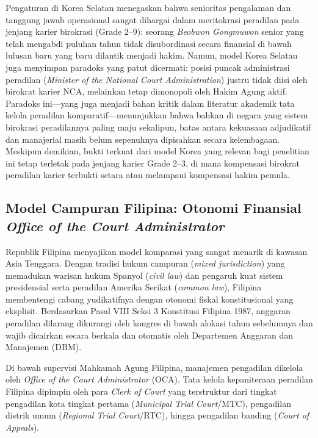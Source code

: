 \documentclass[12pt, a4paper]{article}
\begin{document}
Pengaturan di Korea Selatan menegaskan bahwa senioritas pengalaman dan tanggung jawab operasional sangat dihargai dalam meritokrasi peradilan pada jenjang karier birokrasi (Grade 2--9): seorang \textit{Beobwon Gongmuwon} senior yang telah mengabdi puluhan tahun tidak disubordinasi secara finansial di bawah lulusan baru yang baru dilantik menjadi hakim. Namun, model Korea Selatan juga menyimpan paradoks yang patut dicermati: posisi puncak administrasi peradilan (\textit{Minister of the National Court Administration}) justru tidak diisi oleh birokrat karier NCA, melainkan tetap dimonopoli oleh Hakim Agung aktif. Paradoks ini---yang juga menjadi bahan kritik dalam literatur akademik tata kelola peradilan komparatif---menunjukkan bahwa bahkan di negara yang sistem birokrasi peradilannya paling maju sekalipun, batas antara kekuasaan adjudikatif dan manajerial masih belum sepenuhnya dipisahkan secara kelembagaan. Meskipun demikian, bukti terkuat dari model Korea yang relevan bagi penelitian ini tetap terletak pada jenjang karier Grade 2--3, di mana kompensasi birokrat peradilan karier terbukti setara atau melampaui kompensasi hakim pemula.

\subsection{Model Campuran Filipina: Otonomi Finansial \textit{Office of the Court Administrator}}

Republik Filipina menyajikan model komparasi yang sangat menarik di kawasan Asia Tenggara. Dengan tradisi hukum campuran (\textit{mixed jurisdiction}) yang memadukan warisan hukum Spanyol (\textit{civil law}) dan pengaruh kuat sistem presidensial serta peradilan Amerika Serikat (\textit{common law}), Filipina membentengi cabang yudikatifnya dengan otonomi fiskal konstitusional yang eksplisit. Berdasarkan Pasal VIII Seksi 3 Konstitusi Filipina 1987, anggaran peradilan dilarang dikurangi oleh kongres di bawah alokasi tahun sebelumnya dan wajib dicairkan secara berkala dan otomatis oleh Departemen Anggaran dan Manajemen (DBM).

Di bawah supervisi Mahkamah Agung Filipina, manajemen pengadilan dikelola oleh \textit{Office of the Court Administrator} (OCA). Tata kelola kepaniteraan peradilan Filipina dipimpin oleh para \textit{Clerk of Court} yang terstruktur dari tingkat pengadilan kota tingkat pertama (\textit{Municipal Trial Court}/MTC), pengadilan distrik umum (\textit{Regional Trial Court}/RTC), hingga pengadilan banding (\textit{Court of Appeals}).
\end{document}
